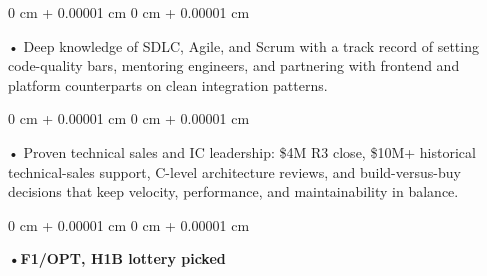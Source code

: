\documentclass[10pt, letterpaper]{article}
\newenvironment{onecolentry}{
    \begin{adjustwidth}{
        0 cm + 0.00001 cm
    }{
        0 cm + 0.00001 cm
    }
}{
    \end{adjustwidth}
} %
\begin{document}
        \begin{onecolentry}
            • Deep knowledge of SDLC, Agile, and Scrum with a track record of setting code-quality bars, mentoring engineers, and partnering with frontend and platform counterparts on clean integration patterns.
        \end{onecolentry}
        \begin{onecolentry}
            • Proven technical sales and IC leadership: \$4M R3 close, \$10M+ historical technical-sales support, C-level architecture reviews, and build-versus-buy decisions that keep velocity, performance, and maintainability in balance.
        \end{onecolentry}
        \begin{onecolentry}
                \textbf{•F1/OPT, H1B lottery picked}
        \end{onecolentry}

    \vspace{2 pt }
\end{document}
